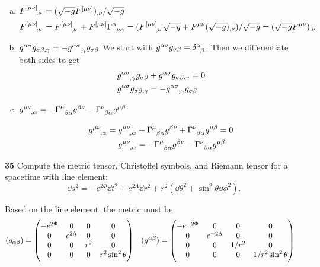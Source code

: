\documentclass[gr-notes.tex]{subfiles}
\begin{document}
\begin{enumerate}[(a)]
%
\item
  $\tensor{F}{^{[\mu\nu]}_{;\nu}} =
   (\sqrt{-g} F^{[\mu\nu]})_{,\nu} / \sqrt{-g}$
%
\begin{displaymath}
  \tensor{F}{^{[\mu\nu]}_{;\nu}} =
  \tensor{F}{^{[\mu\nu]}_{,\nu}} +
  F^{[\mu\nu]} \tensor{\Gamma}{^\alpha_{\nu\alpha}} =
  (\tensor{F}{^{[\mu\nu]}_{,\nu}} \sqrt{-g} +
   F^{\mu\nu} (\sqrt{-g})_{,\nu}) / \sqrt{-g} =
  (\sqrt{-g} F^{\mu\nu})_{,\nu}
\end{displaymath}
%
\item $g^{\alpha\sigma} g_{\sigma\beta,\gamma} =
      -\tensor{g}{^{\alpha\sigma}_{,\gamma}} g_{\sigma\beta}$
%
We start with $g^{\alpha\sigma} g_{\sigma\beta} = \tensor{\delta}{^\alpha_\beta}$. Then we differentiate both sides to get
%
\begin{align*}
  \tensor{g}{^{\alpha\sigma}_{,\gamma}} g_{\sigma\beta} &+
  g^{\alpha\sigma} g_{\sigma\beta,\gamma} =
  0
  \\
  g^{\alpha\sigma} g_{\sigma\beta,\gamma} &=
 -\tensor{g}{^{\alpha\sigma}_{,\gamma}} g_{\sigma\beta}
\end{align*}

\item $\tensor{g}{^{\mu\nu}_{,\alpha}} =
      -\tensor{\Gamma}{^\mu_{\beta\alpha}} g^{\beta\nu} -
       \tensor{\Gamma}{^\nu_{\beta\alpha}} g^{\mu\beta}$

\begin{align*}
  \tensor{g}{^{\mu\nu}_{;\alpha}} = \tensor{g}{^{\mu\nu}_{,\alpha}} &+
  \tensor{\Gamma}{^\mu_{\beta\alpha}} g^{\beta\nu} +
  \tensor{\Gamma}{^\nu_{\beta\alpha}} g^{\mu\beta} =
  0
  \\
  \tensor{g}{^{\mu\nu}_{,\alpha}} &=
 -\tensor{\Gamma}{^\mu_{\beta\alpha}} g^{\beta\nu} -
  \tensor{\Gamma}{^\nu_{\beta\alpha}} g^{\mu\beta}
\end{align*}

\end{enumerate}



\textbf{35}
Compute the metric tensor, Christoffel symbols, and Riemann tensor for a spacetime with line element:
%
\begin{displaymath}
  \dd{s^2} =
 -e^{2\Phi} \dd{t^2} +
  e^{2\Lambda} \dd{r^2} +
  r^2 (\dd{\theta^2} + \sin^2\theta \dd{\phi^2}).
\end{displaymath}

Based on the line element, the metric must be
%
\begin{align*}
  (g_{\alpha\beta}) &=
  \mqty(\dmat[0]{-e^{2\Phi}, e^{2\Lambda}, r^2, r^2 \sin^2\theta}) &
  (g^{\alpha\beta}) &=
  \mqty(\dmat[0]{-e^{-2\Phi}, e^{-2\Lambda}, 1/r^2, 1/r^2 \sin^2\theta})
\end{align*}
\end{document}
